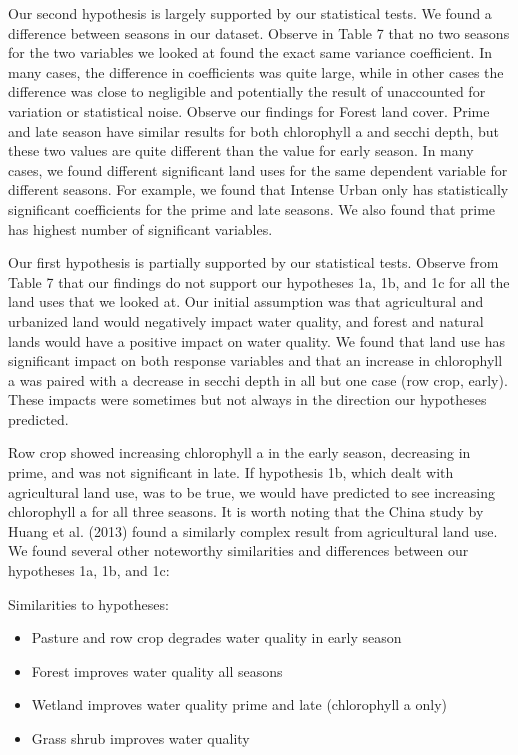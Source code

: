 \documentclass[12pt,]{article}
\providecommand{\tightlist}{%
  \setlength{\itemsep}{0pt}\setlength{\parskip}{0pt}}
\begin{document}
Our second hypothesis is largely supported by our statistical tests. We
found a difference between seasons in our dataset. Observe in Table 7
that no two seasons for the two variables we looked at found the exact
same variance coefficient. In many cases, the difference in coefficients
was quite large, while in other cases the difference was close to
negligible and potentially the result of unaccounted for variation or
statistical noise. Observe our findings for Forest land cover. Prime and
late season have similar results for both chlorophyll a and secchi
depth, but these two values are quite different than the value for early
season. In many cases, we found different significant land uses for the
same dependent variable for different seasons. For example, we found
that Intense Urban only has statistically significant coefficients for
the prime and late seasons. We also found that prime has highest number
of significant variables.

Our first hypothesis is partially supported by our statistical tests.
Observe from Table 7 that our findings do not support our hypotheses 1a,
1b, and 1c for all the land uses that we looked at. Our initial
assumption was that agricultural and urbanized land would negatively
impact water quality, and forest and natural lands would have a positive
impact on water quality. We found that land use has significant impact
on both response variables and that an increase in chlorophyll a was
paired with a decrease in secchi depth in all but one case (row crop,
early). These impacts were sometimes but not always in the direction our
hypotheses predicted.

Row crop showed increasing chlorophyll a in the early season, decreasing
in prime, and was not significant in late. If hypothesis 1b, which dealt
with agricultural land use, was to be true, we would have predicted to
see increasing chlorophyll a for all three seasons. It is worth noting
that the China study by Huang et al. (2013) found a similarly complex
result from agricultural land use. We found several other noteworthy
similarities and differences between our hypotheses 1a, 1b, and 1c:

Similarities to hypotheses:

\begin{itemize}
\tightlist
\item
  Pasture and row crop degrades water quality in early season
\item
  Forest improves water quality all seasons
\item
  Wetland improves water quality prime and late (chlorophyll a only)
\item
  Grass shrub improves water quality
\end{itemize}
\end{document}
